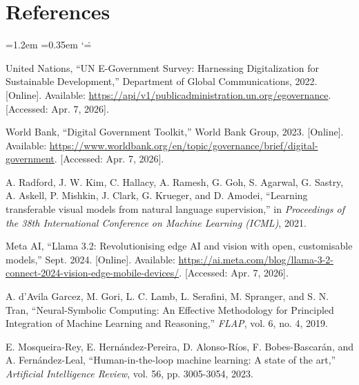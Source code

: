 \makeatletter
\renewenvironment{thebibliography}[1]
     {\section{References}%
	\@mkboth{\MakeUppercase\bibname}{\MakeUppercase\bibname}%
	\list{\@biblabel{\@arabic\c@enumiv}}%
	     {\settowidth\labelwidth{\@biblabel{#1}}%
		\leftmargin=1.2em
		\labelsep=0.35em
		\@openbib@code
		\usecounter{enumiv}%
		\let\p@enumiv\@empty
		\renewcommand\theenumiv{\@arabic\c@enumiv}}%
	\sloppy
	\clubpenalty4000
	\@clubpenalty \clubpenalty
	\widowpenalty4000%
	\sfcode`\.=\@m}
     {\def\@noitemerr{\@latex@warning{Empty `thebibliography' environment}}%
	\endlist}
\makeatother

\begin{thebibliography}{99}

United Nations,
\newblock ``UN E-Government Survey: Harnessing Digitalization for Sustainable Development,'' Department of Global Communications, 2022. [Online]. Available: \url{https://api/v1/publicadministration.un.org/egovernance}. [Accessed: Apr. 7, 2026].

World Bank,
\newblock ``Digital Government Toolkit,'' World Bank Group, 2023. [Online]. Available: \url{https://www.worldbank.org/en/topic/governance/brief/digital-government}. [Accessed: Apr. 7, 2026].

A. Radford, J. W. Kim, C. Hallacy, A. Ramesh, G. Goh, S. Agarwal, G. Sastry, A. Askell, P. Mishkin, J. Clark, G. Krueger, and D. Amodei,
\newblock ``Learning transferable visual models from natural language supervision,'' in \textit{Proceedings of the 38th International Conference on Machine Learning (ICML)}, 2021.

Meta AI,
\newblock ``Llama 3.2: Revolutionising edge AI and vision with open, customisable models,'' Sept. 2024. [Online]. Available: \url{https://ai.meta.com/blog/llama-3-2-connect-2024-vision-edge-mobile-devices/}. [Accessed: Apr. 7, 2026].

A. d'Avila Garcez, M. Gori, L. C. Lamb, L. Serafini, M. Spranger, and S. N. Tran,
\newblock ``Neural-Symbolic Computing: An Effective Methodology for Principled Integration of Machine Learning and Reasoning,'' \textit{FLAP}, vol. 6, no. 4, 2019.

E. Mosqueira-Rey, E. Hernández-Pereira, D. Alonso-Ríos, F. Bobes-Bascarán, and A. Fernández-Leal,
\newblock ``Human-in-the-loop machine learning: A state of the art,'' \textit{Artificial Intelligence Review}, vol. 56, pp. 3005-3054, 2023.


\end{thebibliography}
